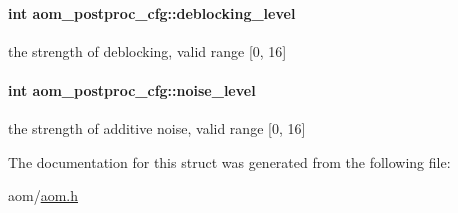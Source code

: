\paragraph[{\texorpdfstring{deblocking\+\_\+level}{deblocking_level}}]{\setlength{\rightskip}{0pt plus 5cm}int aom\+\_\+postproc\+\_\+cfg\+::deblocking\+\_\+level}\hypertarget{structaom__postproc__cfg_ae1137e5688f978994e88b231c72b5a63}{}\label{structaom__postproc__cfg_ae1137e5688f978994e88b231c72b5a63}
the strength of deblocking, valid range \mbox{[}0, 16\mbox{]} 
\paragraph[{\texorpdfstring{noise\+\_\+level}{noise_level}}]{\setlength{\rightskip}{0pt plus 5cm}int aom\+\_\+postproc\+\_\+cfg\+::noise\+\_\+level}\hypertarget{structaom__postproc__cfg_aa68fb341be4d3de6d4feb66d3b659c26}{}\label{structaom__postproc__cfg_aa68fb341be4d3de6d4feb66d3b659c26}
the strength of additive noise, valid range \mbox{[}0, 16\mbox{]} 

The documentation for this struct was generated from the following file\+:\begin{DoxyCompactItemize}
\item 
aom/\hyperlink{aom_8h}{aom.\+h}\end{DoxyCompactItemize}
